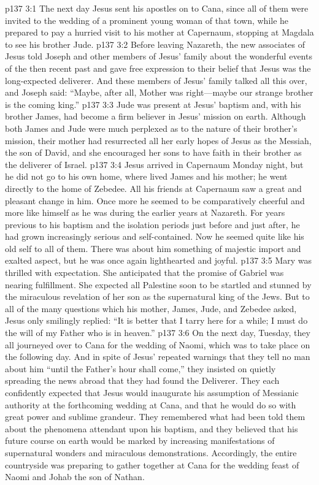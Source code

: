 \vs p137 3:1 The next day Jesus sent his apostles on to Cana, since all of them were invited to the wedding of a prominent young woman of that town, while he prepared to pay a hurried visit to his mother at Capernaum, stopping at Magdala to see his brother Jude.
\vs p137 3:2 Before leaving Nazareth, the new associates of Jesus told Joseph and other members of Jesus’ family about the wonderful events of the then recent past and gave free expression to their belief that Jesus was the long\hyp{}expected deliverer. And these members of Jesus’ family talked all this over, and Joseph said: “Maybe, after all, Mother was right---maybe our strange brother is the coming king.”
\vs p137 3:3 Jude was present at Jesus’ baptism and, with his brother James, had become a firm believer in Jesus’ mission on earth. Although both James and Jude were much perplexed as to the nature of their brother’s mission, their mother had resurrected all her early hopes of Jesus as the Messiah, the son of David, and she encouraged her sons to have faith in their brother as the deliverer of Israel.
\pc \vs p137 3:4 Jesus arrived in Capernaum Monday night, but he did not go to his own home, where lived James and his mother; he went directly to the home of Zebedee. All his friends at Capernaum saw a great and pleasant change in him. Once more he seemed to be comparatively cheerful and more like himself as he was during the earlier years at Nazareth. For years previous to his baptism and the isolation periods just before and just after, he had grown increasingly serious and self\hyp{}contained. Now he seemed quite like his old self to all of them. There was about him something of majestic import and exalted aspect, but he was once again lighthearted and joyful.
\vs p137 3:5 Mary was thrilled with expectation. She anticipated that the promise of Gabriel was nearing fulfillment. She expected all Palestine soon to be startled and stunned by the miraculous revelation of her son as the supernatural king of the Jews. But to all of the many questions which his mother, James, Jude, and Zebedee asked, Jesus only smilingly replied: \textcolor{ubdarkred}{“It is better that I tarry here for a while; I must do the will of my Father who is in heaven.”}
\pc \vs p137 3:6 On the next day, Tuesday, they all journeyed over to Cana for the wedding of Naomi, which was to take place on the following day. And in spite of Jesus’ repeated warnings that they tell no man about him “until the Father’s hour shall come,” they insisted on quietly spreading the news abroad that they had found the Deliverer. They each confidently expected that Jesus would inaugurate his assumption of Messianic authority at the forthcoming wedding at Cana, and that he would do so with great power and sublime grandeur. They remembered what had been told them about the phenomena attendant upon his baptism, and they believed that his future course on earth would be marked by increasing manifestations of supernatural wonders and miraculous demonstrations. Accordingly, the entire countryside was preparing to gather together at Cana for the wedding feast of Naomi and Johab the son of Nathan.
